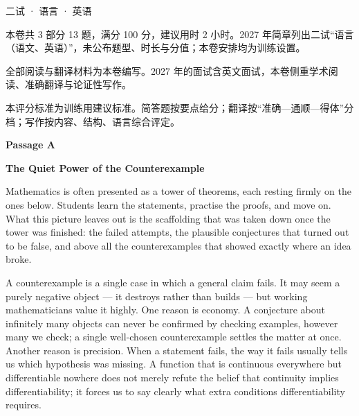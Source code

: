 \documentclass[cjk=noto, seal=first]{mojing-exam}
\begin{document}
\begin{paper}[time={建议 2 小时（训练设置）}, full=100]{二试 · 语言 · 英语}

\begin{instructions}
  \item 本卷共 3 部分 13 题，满分 100 分，建议用时 2 小时。2027 年简章列出二试“语言（语文、英语）”，未公布题型、时长与分值；本卷安排均为训练设置。
  \item 全部阅读与翻译材料为本卷编写。2027 年的面试含英文面试，本卷侧重学术阅读、准确翻译与论证性写作。
\end{instructions}

\begin{gradingnotes}
  \item 本评分标准为训练用建议标准。简答题按要点给分；翻译按“准确—通顺—得体”分档；写作按内容、结构、语言综合评定。
\end{gradingnotes}



\noindent\textbf{Passage A}

\begin{center}\textbf{The Quiet Power of the Counterexample}\end{center}

Mathematics is often presented as a tower of theorems, each resting firmly on the ones below. Students learn the statements,
practise the proofs, and move on. What this picture leaves out is the scaffolding that was taken down once the tower was finished:
the failed attempts, the plausible conjectures that turned out to be false, and above all the counterexamples that showed exactly
where an idea broke.

A counterexample is a single case in which a general claim fails. It may seem a purely negative object --- it destroys rather than
builds --- but working mathematicians value it highly. One reason is economy. A conjecture about infinitely many objects can never be
confirmed by checking examples, however many we check; a single well-chosen counterexample settles the matter at once. Another reason
is precision. When a statement fails, the way it fails usually tells us which hypothesis was missing. A function that is continuous
everywhere but differentiable nowhere does not merely refute the belief that continuity implies differentiability; it forces us to say
clearly what extra conditions differentiability requires.


\end{paper}
\end{document}
